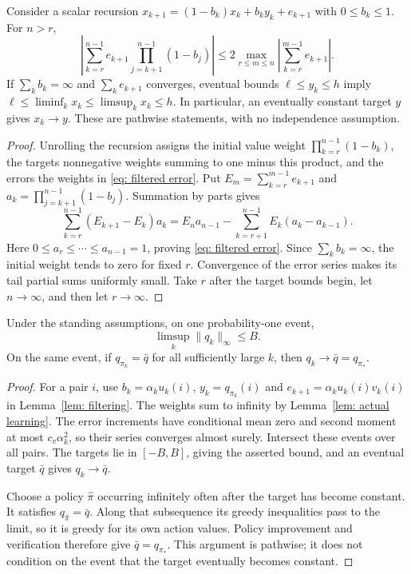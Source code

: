 \begin{lemma}\label{lem: filtering}
Consider a scalar recursion $x_{k+1}=(1-b_k)x_k+b_ky_k+e_{k+1}$ with $0\le b_k\le1$. For $n>r$,
\begin{equation}\label{eq: filtered error}
\left|\sum_{k=r}^{n-1}e_{k+1}\prod_{j=k+1}^{n-1}(1-b_j)\right|
\le2\max_{r\le m\le n}\left|\sum_{k=r}^{m-1}e_{k+1}\right|.
\end{equation}
If $\sum_k b_k=\infty$ and $\sum_k e_{k+1}$ converges, eventual bounds $\ell\le y_k\le h$ imply $\ell\le\liminf_k x_k\le\limsup_k x_k\le h$. In particular, an eventually constant target $y$ gives $x_k\to y$. These are pathwise statements, with no independence assumption.
\end{lemma}
\begin{proof}
Unrolling the recursion assigns the initial value weight $\prod_{k=r}^{n-1}(1-b_k)$, the targets nonnegative weights summing to one minus this product, and the errors the weights in \eqref{eq: filtered error}. Put $E_m=\sum_{k=r}^{m-1}e_{k+1}$ and $a_k=\prod_{j=k+1}^{n-1}(1-b_j)$. Summation by parts gives
\[
\sum_{k=r}^{n-1}(E_{k+1}-E_k)a_k
=E_n a_{n-1}-\sum_{k=r+1}^{n-1}E_k(a_k-a_{k-1}).
\]
Here $0\le a_r\le\cdots\le a_{n-1}=1$, proving \eqref{eq: filtered error}. Since $\sum_kb_k=\infty$, the initial weight tends to zero for fixed $r$. Convergence of the error series makes its tail partial sums uniformly small. Take $r$ after the target bounds begin, let $n\to\infty$, and then let $r\to\infty$.
\end{proof}

\begin{lemma}\label{thm: bounded limit sets}
Under the standing assumptions, on one probability-one event,
\[
\limsup_k\|q_k\|_\infty\le B.
\]
On the same event, if $q_{\pi_k}=\bar q$ for all sufficiently large $k$, then $q_k\to\bar q=q_{\pi_*}$.
\end{lemma}
\begin{proof}
For a pair $i$, use $b_k=\alpha_k u_k(i)$, $y_k=q_{\pi_k}(i)$ and $e_{k+1}=\alpha_k u_k(i)v_k(i)$ in Lemma~\ref{lem: filtering}. The weights sum to infinity by Lemma~\ref{lem: actual learning}. The error increments have conditional mean zero and second moment at most $c_v\alpha_k^2$, so their series converges almost surely. Intersect these events over all pairs. The targets lie in $[-B,B]$, giving the asserted bound, and an eventual target $\bar q$ gives $q_k\to\bar q$.

Choose a policy $\widehat\pi$ occurring infinitely often after the target has become constant. It satisfies $q_{\widehat\pi}=\bar q$. Along that subsequence its greedy inequalities pass to the limit, so it is greedy for its own action values. Policy improvement and verification therefore give $\bar q=q_{\pi_*}$. This argument is pathwise; it does not condition on the event that the target eventually becomes constant.
\end{proof}

